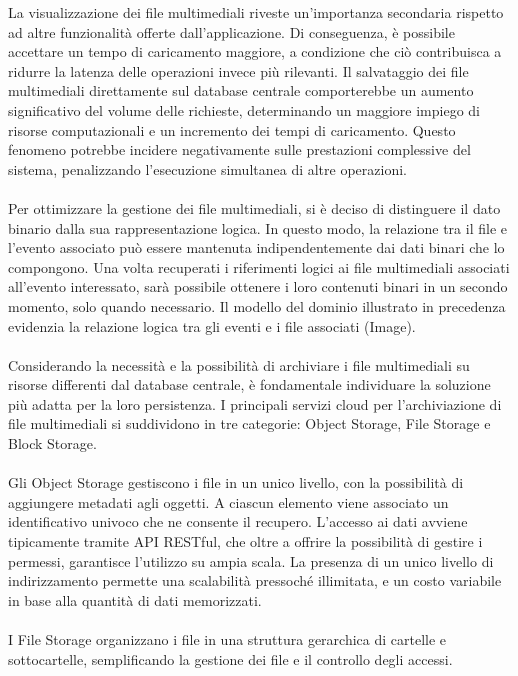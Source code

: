La visualizzazione dei file multimediali riveste un'importanza secondaria
rispetto ad altre funzionalità offerte dall'applicazione.
Di conseguenza, è possibile accettare un tempo di caricamento maggiore, 
a condizione che ciò contribuisca a ridurre la latenza delle operazioni invece più rilevanti. 
Il salvataggio dei file multimediali direttamente sul database centrale 
comporterebbe un aumento significativo del volume delle richieste, 
determinando un maggiore impiego di risorse computazionali e
un incremento dei tempi di caricamento. 
Questo fenomeno potrebbe incidere negativamente sulle prestazioni complessive del sistema, 
penalizzando l'esecuzione simultanea di altre operazioni.\\
\\
Per ottimizzare la gestione dei file multimediali, 
si è deciso di distinguere il dato binario dalla sua rappresentazione logica. 
In questo modo, la relazione tra il file e l'evento associato può essere mantenuta 
indipendentemente dai dati binari che lo compongono. 
Una volta recuperati i riferimenti logici ai file multimediali
associati all'evento interessato, 
sarà possibile ottenere i loro contenuti binari in un secondo momento, 
solo quando necessario.
Il modello del dominio illustrato in precedenza evidenzia 
la relazione logica tra gli eventi e i file associati (Image).\\
\\
Considerando la necessità e la possibilità di archiviare i file multimediali 
su risorse differenti dal database centrale, 
è fondamentale individuare la soluzione più adatta per la loro persistenza. 
I principali servizi cloud per l'archiviazione di file multimediali
si suddividono in tre categorie: 
Object Storage, File Storage e Block Storage.\\
\\
Gli Object Storage gestiscono i file in un unico livello, 
con la possibilità di aggiungere metadati agli oggetti. 
A ciascun elemento viene associato un identificativo univoco che ne consente il recupero. 
L'accesso ai dati avviene tipicamente tramite API RESTful, 
che oltre a offrire la possibilità di gestire i permessi, 
garantisce l'utilizzo su ampia scala. 
La presenza di un unico livello di indirizzamento
permette una scalabilità pressoché illimitata, 
e un costo variabile in base alla quantità di dati memorizzati.\\
\\
I File Storage organizzano i file in una struttura gerarchica di cartelle e sottocartelle, 
semplificando la gestione dei file e il controllo degli accessi. 
